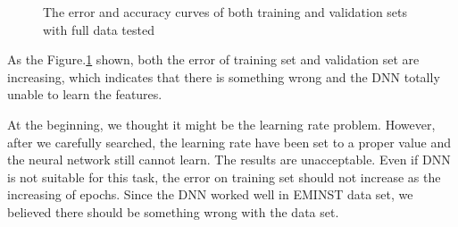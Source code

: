 \documentclass{article}
\begin{document}
\begin{figure}[h]%
\centering
{}%
%
\qquad
{}%
%
\qquad
\caption{The error and accuracy curves of both training and validation sets with full data tested}
\label{fig:fulldata}
\end{figure}

As the Figure.\ref{fig:fulldata} shown, both the error of training set and validation set are increasing, which indicates that there is something wrong and the DNN totally unable to learn the features.

At the beginning, we thought it might be the learning rate problem. However, after we carefully searched, the learning rate have been set to a proper value and the neural network still cannot learn. The results are unacceptable. Even if DNN is not suitable for this task, the error on training set should not increase as the increasing of epochs. Since the DNN worked well in EMINST data set, we believed there should be something wrong with the data set.
\end{document}
